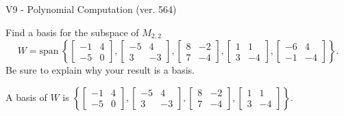 \begin{exercise}
  \begin{exerciseTitle}V9 - Polynomial Computation (ver. 564)\end{exerciseTitle}
  \begin{exerciseStatement}
    Find a basis for the subspace of \(M_{2,2}\) 
\[W=\mathrm{span}\ \left\{\left[\begin{array}{cc}
-1 & 4 \\
-5 & 0
\end{array}\right] , \left[\begin{array}{cc}
-5 & 4 \\
3 & -3
\end{array}\right] , \left[\begin{array}{cc}
8 & -2 \\
7 & -4
\end{array}\right] , \left[\begin{array}{cc}
1 & 1 \\
3 & -4
\end{array}\right] , \left[\begin{array}{cc}
-6 & 4 \\
-1 & -4
\end{array}\right]\right\}.\]
 Be sure to explain why your result is a basis.


  \end{exerciseStatement}
  \begin{exerciseAnswer}
   A basis of \(W\) is  \(\left\{\left[\begin{array}{cc}
-1 & 4 \\
-5 & 0
\end{array}\right] , \left[\begin{array}{cc}
-5 & 4 \\
3 & -3
\end{array}\right] , \left[\begin{array}{cc}
8 & -2 \\
7 & -4
\end{array}\right] , \left[\begin{array}{cc}
1 & 1 \\
3 & -4
\end{array}\right]\right\}\).
  


  \end{exerciseAnswer}
\end{exercise}